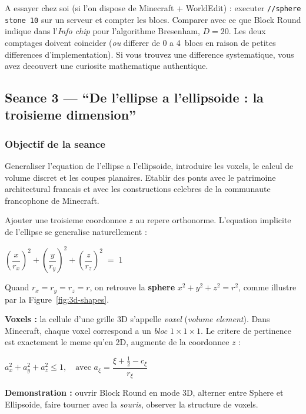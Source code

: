 \documentclass[12pt,a4paper]{scrartcl}
\newcommand{\acc}[1]{\textcolor{accent}{\textbf{#1}}}
\newcommand{\cmd}[1]{\textcolor{earth}{\texttt{\small #1}}}
\newcommand{\tempo}[1]{\textnormal{\footnotesize\color{bg!90!white}\textsf{#1}}}
\begin{document}
\begin{minecraft}
A essayer chez soi (si l'on dispose de Minecraft + WorldEdit) : executer \cmd{//sphere stone 10} sur un serveur et compter les blocs. Comparer avec ce que Block Round indique dans l'\emph{Info chip} pour l'algorithme Bresenham, $D = 20$. Les deux comptages doivent coincider (\emph{ou} differer de 0 a 4~blocs en raison de petites differences d'implementation). Si vous trouvez une difference systematique, vous avez decouvert une curiosite mathematique authentique.
\end{minecraft}

\subsection{Seance 3 --- \enquote{De l'ellipse a l'ellipsoide : la troisieme dimension}}\label{aula3}

\subsubsection*{Objectif de la seance}
Generaliser l'equation de l'ellipse a l'ellipsoide, introduire les voxels, le calcul de volume discret et les coupes planaires. Etablir des ponts avec le patrimoine architectural francais et avec les constructions celebres de la communaute francophone de Minecraft.

\begin{activite}[3.1 --- De l'equation 2D a la 3D \quad\tempo{15 min}]\label{at:31}
Ajouter une troisieme coordonnee $z$ au repere orthonorme. L'equation implicite de l'ellipse se generalise naturellement :

\begin{formule}
\centering
$\displaystyle \left(\dfrac{x}{r_x}\right)^{\!2} + \left(\dfrac{y}{r_y}\right)^{\!2} + \left(\dfrac{z}{r_z}\right)^{\!2} \;=\; 1$
\end{formule}

Quand $r_x = r_y = r_z = r$, on retrouve la \acc{sphere} $x^2 + y^2 + z^2 = r^2$, comme illustre par la Figure~\ref{fig:3d-shapes}.

\textbf{Voxels :} la cellule d'une grille 3D s'appelle \emph{voxel} (\emph{volume element}). Dans Minecraft, chaque voxel correspond a un \emph{bloc} $1\times1\times1$. Le critere de pertinence est exactement le meme qu'en 2D, augmente de la coordonnee $z$ :

\begin{formule}
\centering
$\displaystyle a_x^2 + a_y^2 + a_z^2 \leq 1,\quad \text{avec } a_\xi = \dfrac{\xi + \tfrac{1}{2} - c_\xi}{r_\xi}$
\end{formule}

\textbf{Demonstration :} ouvrir Block Round en mode 3D, alterner entre Sphere et Ellipsoide, faire tourner avec la \emph{souris}, observer la structure de voxels.
\end{activite}
\end{document}
